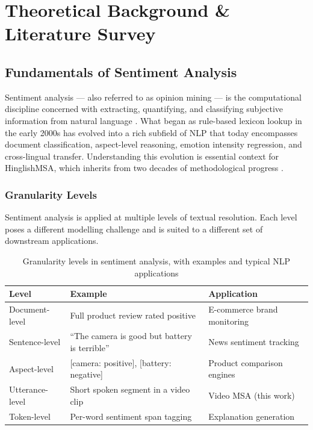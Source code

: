 \chapter{Theoretical Background \& Literature Survey}
\onehalfspacing

\section{Fundamentals of Sentiment Analysis}

Sentiment analysis --- also referred to as opinion mining --- is the computational discipline concerned with extracting, quantifying, and classifying subjective information from natural language \cite{liu2012sentiment}. What began as rule-based lexicon lookup in the early 2000s has evolved into a rich subfield of NLP that today encompasses document classification, aspect-level reasoning, emotion intensity regression, and cross-lingual transfer. Understanding this evolution is essential context for HinglishMSA, which inherits from two decades of methodological progress \cite{cambria2016affective}.

\subsection{Granularity Levels}

Sentiment analysis is applied at multiple levels of textual resolution. Each level poses a different modelling challenge and is suited to a different set of downstream applications.

\begin{table}[ht]
\centering
\caption{Granularity levels in sentiment analysis, with examples and typical NLP applications}
\label{tab:granularity}
\renewcommand{\arraystretch}{1.35}
\begin{tabular}{p{2.8cm} p{4.5cm} p{4.5cm}}
\toprule
\textbf{Level} & \textbf{Example} & \textbf{Application} \\
\midrule
Document-level   & Full product review rated positive & E-commerce brand monitoring \\
Sentence-level   & ``The camera is good but battery is terrible'' & News sentiment tracking \\
Aspect-level     & [camera: positive], [battery: negative] & Product comparison engines \\
Utterance-level  & Short spoken segment in a video clip & Video MSA (this work) \\
Token-level      & Per-word sentiment span tagging & Explanation generation \\
\bottomrule
\end{tabular}
\end{table}

